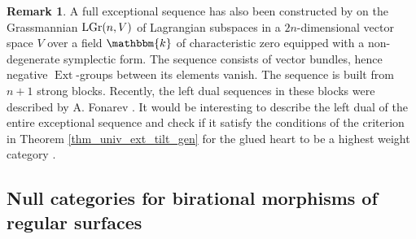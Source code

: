 \documentclass[12pt,a4paper]{amsart}
\newcommand{\dD}{{\mathcal{D}}}
\newcommand{\kk}{\mathbbm{k}}
\newcommand{\Ext}{\mathop{\operatorname{Ext}}\nolimits}
\newcommand{\Coh}{\mathop{\operatorname{Coh}}\nolimits}
\newcommand{\modu}{\mathop{\textrm{mod--}}}
\theoremstyle{definition}
\newtheorem{REM}[LEM]{Remark}
\begin{document}
\begin{REM} 


	A full exceptional sequence has also been constructed by \cite{KuzPol} on the Grassmannian ${\rm LGr}(n,V)$ of Lagrangian subspaces in a $2n$-dimensional vector space $V$ over a field $\kk$ of characteristic zero equipped with a non-degenerate symplectic form. The sequence consists of vector bundles, hence negative $\Ext$-groups between its elements vanish.  The sequence is built from $n+1$ strong blocks. Recently, the left dual sequences in these blocks were described by  A. Fonarev \cite{Fon2}. 
	It would be interesting to describe the left dual of the entire exceptional sequence and check if it satisfy the conditions of the criterion  in 
Theorem \ref{thm_univ_ext_tilt_gen} for the glued heart to be a highest weight category . 
\end{REM}


%

\vspace{0.3cm}
\subsection{Null categories for birational morphisms of regular surfaces}\label{birat-surf}~\\

\end{document}
